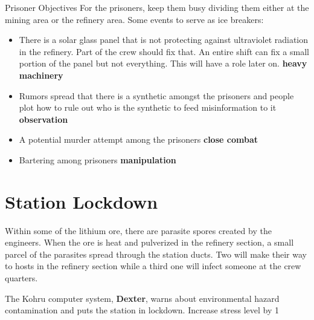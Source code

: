 


\medskip
\begin{rpg-commentbox}{Prisoner Objectives}
For the prisoners, keep them busy dividing them either at the mining area or the refinery area. Some events to serve as ice breakers:

\begin{itemize}
    \item There is a solar glass panel that is not protecting against ultraviolet radiation in the refinery. Part of the crew should fix that. An entire shift can fix a small portion of the panel but not everything. This will have a role later on. \textbf{heavy machinery}

    \item Rumors spread that there is a synthetic amongst the prisoners and people plot how to rule out who is the synthetic to feed misinformation to it \textbf{observation}

    \item A potential murder attempt among the prisoners \textbf{close combat}

    \item Bartering among prisoners \textbf{manipulation}
\end{itemize}
\end{rpg-commentbox}


\newsect

\section{Station Lockdown}



\begin{rpg-commentbox}{}
    
    Within some of the lithium ore, there are parasite spores created by the engineers. When the ore is heat and pulverized in the refinery section, a small parcel of the parasites spread through the station ducts. Two will make their way to hosts in the refinery section while a third one will infect someone at the crew quarters. 
    
    The Kohru computer system, \textbf{Dexter}, warns about environmental hazard contamination and puts the station in lockdown. Increase stress level by 1
\end{rpg-commentbox}    


